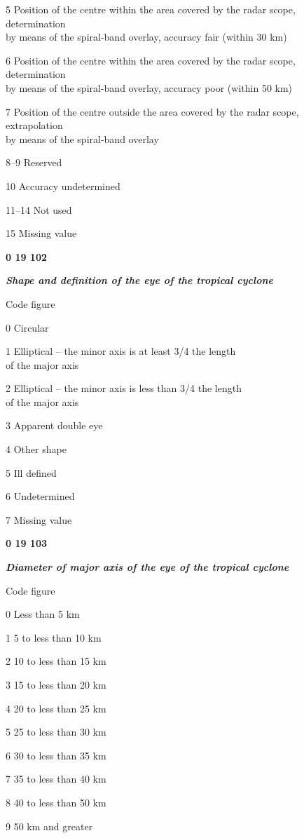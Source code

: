 5 Position of the centre within the area covered by the radar scope, determination\\
by means of the spiral-band overlay, accuracy fair (within 30 km)

6 Position of the centre within the area covered by the radar scope, determination\\
by means of the spiral-band overlay, accuracy poor (within 50 km)

7 Position of the centre outside the area covered by the radar scope, extrapolation\\
by means of the spiral-band overlay

8--9 Reserved

10 Accuracy undetermined

11--14 Not used

15 Missing value

\textbf{0 19 102}

\emph{\textbf{Shape and definition of the eye of the tropical cyclone}}

Code figure

0 Circular

1 Elliptical -- the minor axis is at least 3/4 the length\\
of the major axis

2 Elliptical -- the minor axis is less than 3/4 the length\\
of the major axis

3 Apparent double eye

4 Other shape

5 Ill defined

6 Undetermined

7 Missing value

\textbf{0 19 103}

\emph{\textbf{Diameter of major axis of the eye of the tropical cyclone}}

Code figure

0 Less than 5 km

1 5 to less than 10 km

2 10 to less than 15 km

3 15 to less than 20 km

4 20 to less than 25 km

5 25 to less than 30 km

6 30 to less than 35 km

7 35 to less than 40 km

8 40 to less than 50 km

9 50 km and greater

